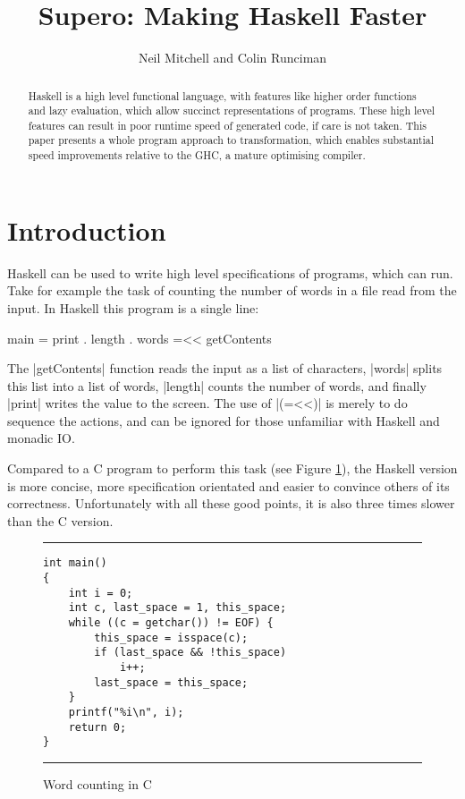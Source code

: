 \documentclass{llncs}
\newenvironment{fig}
    {\begin{figure}[tbp]\hrule}
    {\end{figure}}
\newcommand{\figend}{\hrule}
\begin{document}
\title{Supero: Making Haskell Faster}

\author{Neil Mitchell and Colin Runciman}


\maketitle              %

\begin{abstract}
Haskell is a high level functional language, with features like higher order functions and lazy evaluation, which allow succinct representations of programs. These high level features can result in poor runtime speed of generated code, if care is not taken. This paper presents a whole program approach to transformation, which enables substantial speed improvements relative to the GHC, a mature optimising compiler.
\end{abstract}

\section{Introduction}

Haskell can be used to write high level specifications of programs, which can run. Take for example the task of counting the number of words in a file read from the input. In Haskell this program is a single line:

\begin{code}
main = print . length . words =<< getContents
\end{code}

The |getContents| function reads the input as a list of characters, |words| splits this list into a list of words, |length| counts the number of words, and finally |print| writes the value to the screen. The use of |(=<<)| is merely to do sequence the actions, and can be ignored for those unfamiliar with Haskell and monadic IO.

Compared to a C program to perform this task (see Figure \ref{fig:c_words}), the Haskell version is more concise, more specification orientated and easier to convince others of its correctness. Unfortunately with all these good points,  it is also three times slower than the C version.

\begin{fig}
\bigskip
\begin{verbatim}
int main()
{
	int i = 0;
	int c, last_space = 1, this_space;
	while ((c = getchar()) != EOF) {
		this_space = isspace(c);
		if (last_space && !this_space)
			i++;
		last_space = this_space;
	}
	printf("%i\n", i);
	return 0;
}
\end{verbatim}
\figend
\caption{Word counting in C}
\label{fig:c_words}
\end{fig}
\end{document}
